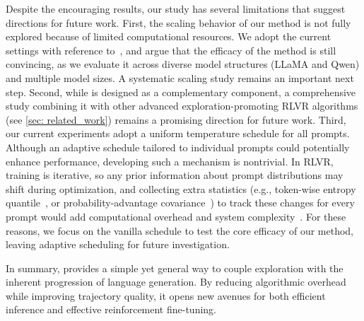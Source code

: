 Despite the encouraging results, our study has several limitations that suggest directions for future work. 
%
First, the scaling behavior of our method is not fully explored because of limited computational resources. 
%
We adopt the current settings with reference to~\citep{xiong2025minimalist,shao2025spurious,wang2025reinforcement}, and argue that the efficacy of the method is still convincing, as we evaluate it across diverse model structures (LLaMA and Qwen) and multiple model sizes. 
%
A systematic scaling study remains an important next step.
%
Second, while \alg is designed as a complementary component, a comprehensive study combining it with other advanced exploration-promoting RLVR algorithms (see \cref{sec: related_work}) remains a promising direction for future work.
%
Third, our current experiments adopt a uniform temperature schedule for all prompts. 
%
Although an adaptive schedule tailored to individual prompts could potentially enhance performance, developing such a mechanism is nontrivial. 
%
In RLVR, training is iterative, so any prior information about prompt distributions may shift during optimization, and collecting extra statistics (e.g., token-wise entropy quantile~\citep{wang2025beyond}, or probability-advantage covariance~\citep{cui2025entropy}) to track these changes for every prompt would add computational overhead and system complexity~\citep{li2025treepo, liu2025uniform}.
%
For these reasons, we focus on the vanilla schedule to test the core efficacy of our method, leaving adaptive scheduling for future investigation.
%


In summary, \alg provides a simple yet general way to couple exploration with the inherent progression of language generation. 
%
By reducing algorithmic overhead while improving trajectory quality, it opens new avenues for both efficient inference and effective reinforcement fine-tuning.